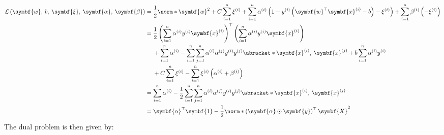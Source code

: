 \documentclass{article}
\begin{document}
\begin{align*}
    \mathcal{L}\left( \symbf{w},\: b,\: \symbf{\xi},\: \symbf{\alpha},\: \symbf{\beta} \right) & = \frac{1}{2}\norm*{\symbf{w}}^2 + C \sum_{i = 1}^n \xi^{\left( i \right)} + \sum_{i = 1}^n \alpha^{\left( i \right)} \left( 1 - y^{\left( i \right)} \left( \symbf{w}^\top \symbf{x}^{\left( i \right)} - b \right) - \xi^{\left( i \right)} \right) + \sum_{i = 1}^n \beta^{\left( i \right)} \left( -\xi^{\left( i \right)} \right) \\
                                                                                               & =
    \begin{aligned}[t]
         & \frac{1}{2} \left( \sum_{i = 1}^n \alpha^{\left( i \right)} y^{\left( i \right)} \symbf{x}^{\left( i \right)} \right)^\top \left( \sum_{i = 1}^n \alpha^{\left( i \right)} y^{\left( i \right)} \symbf{x}^{\left( i \right)} \right)                                                                                \\
         & + \sum_{i = 1}^n \alpha^{\left( i \right)} - \sum_{i = 1}^n \sum_{j = 1}^n \alpha^{\left( i \right)} \alpha^{\left( j \right)} y^{\left( i \right)} y^{\left( j \right)} \abracket*{\symbf{x}^{\left( i \right)},\: \symbf{x}^{\left( j \right)}} + b \sum_{i = 1}^n \alpha^{\left( i \right)} y^{\left( i \right)} \\
         & + C \sum_{i = 1}^n \xi^{\left( i \right)} - \sum_{i = 1}^n \xi^{\left( i \right)} \left( \alpha^{\left( i \right)} + \beta^{\left( i \right)} \right)
    \end{aligned}
    \\
                                                                                               & = \sum_{i = 1}^n \alpha^{\left( i \right)} - \frac{1}{2} \sum_{i = 1}^n \sum_{j = 1}^n \alpha^{\left( i \right)} \alpha^{\left( j \right)} y^{\left( i \right)} y^{\left( j \right)} \abracket*{\symbf{x}^{\left( i \right)},\: \symbf{x}^{\left( j \right)}}                                                                          \\
                                                                                               & = \symbf{\alpha}^\top \symbf{1} - \frac{1}{2} \norm*{\left( \symbf{\alpha} \odot \symbf{y} \right)^\top \symbf{X}}^2
\end{align*}
The dual problem is then given by:
\end{document}
